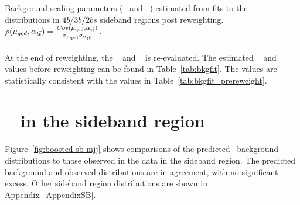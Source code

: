 \begin{table}[htbp!]
\begin{center}
\caption{Background scaling parameters (\muqcd~ and \alphatt~) estimated from fits to the \mleadJ~ distributions in $4b/3b/2bs$ sideband regions post reweighting. $\rho(\mu_{qcd},\alpha_{t\bar{t}}) = \frac{Cov(\rm \mu_{qcd},\rm \alpha_{\rm t\bar{t}})}{\rm \sigma_{\mu_{qcd}} \rm \sigma_{\alpha_{\rm t\bar{t}}} }$.}

\label{tab:bkgfit}
\end{center}
\end{table}

\paragraph{}
At the end of reweighting, the \muqcd~ and \alphatt~ is re-evaluated. The estimated \muqcd~ and \alphatt~ values before reweighting can be found in Table~\ref{tab:bkgfit}. 
The values are statistically consistent with the values in Table~\ref{tab:bkgfit_prereweight}.



\section{\mtwoJ~ in the sideband region}
\label{sec:boosted-sb}

\paragraph{}
Figure~\ref{fig:boosted-sb-mjj} shows comparisons of the predicted \mtwoJ~background distributions to those observed in the data in the sideband region.
The predicted background and observed distributions are in agreement, with no significant excess.
Other sideband region distributions are shown in Appendix~\ref{AppendixSB}.

